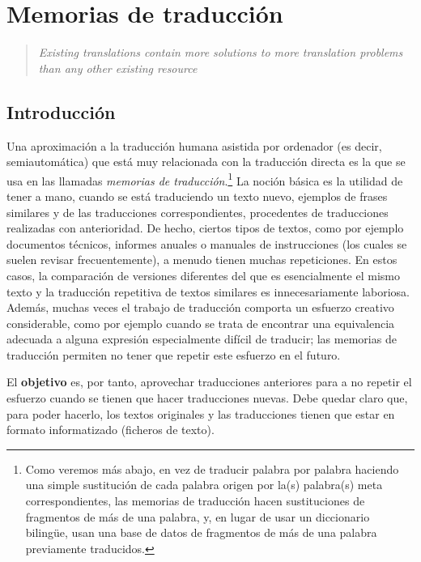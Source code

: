 \chapter{Memorias de traducción} \label{se:memtrad} 

\begin{quote} \textsl{Existing translations contain more solutions to more translation problems than any other existing resource} \citep{isabelle93p} \end{quote} 

\section{Introducción} 

Una aproximación a la traducción humana asistida por ordenador (es decir, semiautomática) que está muy relacionada con la traducción directa es la que se usa en las llamadas \emph{memorias de traducción}.\footnote{Como veremos más abajo, en vez de traducir palabra por palabra haciendo una simple sustitución de cada palabra origen por la(s) palabra(s) meta correspondientes, las memorias de traducción hacen sustituciones de fragmentos de más de una palabra, y, en lugar de usar un diccionario bilingüe, usan una base de datos de fragmentos de más de una palabra previamente traducidos.} La noción básica \citep{somers96b,samuelson-brown96b} es la utilidad de tener a mano, cuando se está traduciendo un texto nuevo, ejemplos de frases similares y de las traducciones correspondientes, procedentes de traducciones realizadas con anterioridad. De hecho, ciertos tipos de textos, como por ejemplo documentos técnicos, informes anuales o manuales de instrucciones (los cuales se suelen revisar frecuentemente), a menudo tienen muchas repeticiones. En estos casos, la comparación de versiones diferentes del que es esencialmente el mismo texto y la traducción repetitiva de textos similares es innecesariamente laboriosa. Además, muchas veces el trabajo de traducción comporta un esfuerzo creativo considerable, como por ejemplo cuando se trata de encontrar una equivalencia adecuada a alguna expresión especialmente difícil de traducir; las memorias de traducción permiten no tener que repetir este esfuerzo en el futuro. 

El \textbf{objetivo} es, por tanto, aprovechar traducciones anteriores para a no repetir el esfuerzo cuando se tienen que hacer traducciones nuevas. Debe quedar claro que, para poder hacerlo, los textos originales y las traducciones tienen que estar en formato informatizado (ficheros de texto). 

